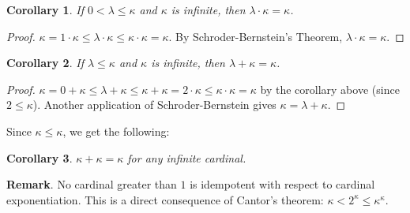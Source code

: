 \documentclass[12pt]{article}
\newtheorem{cor}{Corollary}
\begin{document}
\begin{cor} If $0< \lambda \le \kappa$ and $\kappa$ is infinite, then $\lambda \cdot \kappa = \kappa$. \end{cor}
\begin{proof}  $\kappa = 1 \cdot \kappa \le \lambda \cdot \kappa \le \kappa \cdot \kappa = \kappa$.  By Schroder-Bernstein's Theorem, $\lambda \cdot \kappa = \kappa$.
\end{proof}

\begin{cor} If $\lambda \le \kappa$ and $\kappa$ is infinite, then $\lambda + \kappa = \kappa$. \end{cor}
\begin{proof}  $\kappa = 0 + \kappa \le \lambda + \kappa \le \kappa + \kappa = 2\cdot \kappa \le \kappa \cdot \kappa = \kappa$ by the corollary above (since $2\le \kappa$).  Another application of Schroder-Bernstein gives $\kappa = \lambda+\kappa$.
\end{proof}

Since $\kappa\le \kappa$, we get the following:
\begin{cor} $\kappa + \kappa = \kappa$ for any infinite cardinal. \end{cor}

\textbf{Remark}.  No cardinal greater than $1$ is idempotent with respect to cardinal exponentiation.  This is a direct consequence of Cantor's theorem: $\kappa < 2^ \kappa \le \kappa ^ \kappa$.
\end{document}
